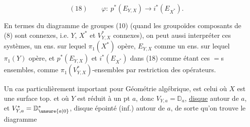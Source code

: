 \[
(18)\qquad \varphi:\ p^*(E_{Y,X})\longrightarrow i^*(E_{X^*}).
\]

En termes du diagramme de groupes
(10) (quand les  groupoïdes composants de
(8) sont connexes, i.e. $Y$, $X^*$ et $V^*_{Y,X}$
connexes), on peut aussi interpréter
ces systèmes, 
un ens. sur lequel $\pi_1(X^*)$ opère, $E_{Y,X}$
comme un ens. sur lequel $\pi_1(Y)$ opère,
et $p^*(E_{Y,X})$ et $i^*(E_{X^*})$ dans (18) comme
étant ces $=$s ensembles,  comme
$\pi_1(V^*_{Y,X})$-ensembles  par restriction
des opérateurs.


Un cas  particulièrement important
pour   Géométrie algébrique,
est celui où $X$ est une surface
top. et où $Y$ est réduit à un pt $a$,
donc $V_{Y,a}=\mathbb D_a$, \uline{disque}  autour de $a$,
et $V^*_{Y,a}=\mathbb D^*_{\unsure{a|0}}$, disque épointé (inf.) autour
de $a$, de sorte qu'on trouve le diagramme

